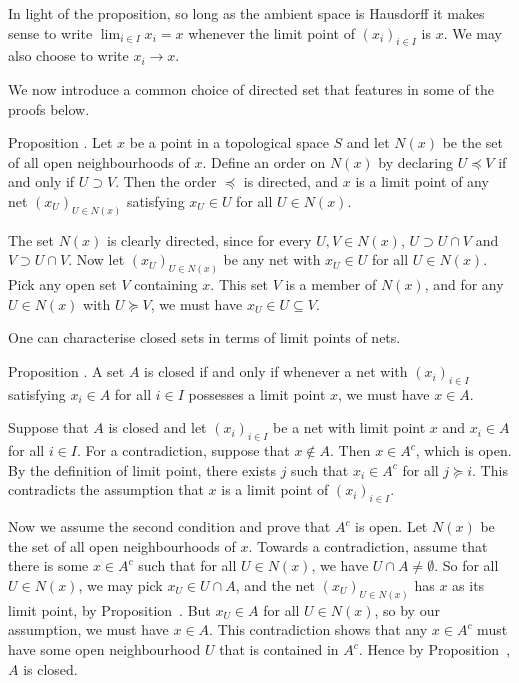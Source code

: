 In light of the proposition, so long as the ambient space is Hausdorff it makes sense to write
$\lim_{i\in I} x_i = x$ whenever the limit point of $(x_i)_{i\in I}$ is $x$. We may also choose
to write $x_i \to x$.

We now introduce a common choice of directed set that features in some of the proofs below.

\edef\propnbhdnet{\the\thmcount}
\proclaim Proposition \advthm.
Let $x$ be a point in a topological space $S$ and let $N(x)$ be the set of all open neighbourhoods
of $x$. Define an order on $N(x)$ by declaring $U\preceq V$ if and only if $U\supset V$. Then the order
$\preceq$ is directed, and $x$ is a limit point of any
net $(x_U)_{U\in N(x)}$ satisfying $x_U\in U$ for all $U\in N(x)$.

\proof The set $N(x)$ is clearly directed, since for every $U,V\in N(x)$,
$U \supset U\cap V$ and $V\supset U\cap V$. Now let $(x_U)_{U\in N(x)}$ be any net with
$x_U\in U$ for all $U\in N(x)$. Pick any open set $V$ containing $x$. This set $V$ is a member of
$N(x)$, and for any $U\in N(x)$ with $U\succeq V$, we must have $x_U\in U \subseteq V$.\slug

One can characterise closed sets in terms of limit points of nets.

\proclaim Proposition \advthm. A set $A$ is closed if and only if whenever a
net with $(x_i)_{i\in I}$ satisfying $x_i\in A$ for all $i\in I$ possesses a limit point $x$,
we must have $x\in A$.

\proof Suppose that $A$ is closed and let $(x_i)_{i\in I}$ be a net with limit point $x$
and $x_i\in A$ for all $i\in I$. For a contradiction, suppose that $x\notin A$. Then $x \in A^c$,
which is open. By the definition of limit point, there exists $j$ such that $x_i\in A^c$ for all
$j\succeq i$. This contradicts the assumption that $x$ is a limit point of $(x_i)_{i\in I}$.

Now we assume the second condition and prove that $A^c$ is open.
Let $N(x)$ be the set of all open neighbourhoods of $x$.
Towards a contradiction, assume
that there is some $x\in A^c$ such that for all $U\in N(x)$, we have $U\cap A \ne \emptyset$.
So for all $U\in N(x)$, we may pick $x_U\in U\cap A$, and the net $(x_U)_{U\in N(x)}$
has $x$ as its limit point, by Proposition~{\propnbhdnet}. But $x_U\in A$ for all $U\in N(x)$,
so by our assumption, we must have $x\in A$. This contradiction shows that
any $x\in A^c$ must have some open neighbourhood $U$ that is contained in $A^c$. Hence by
Proposition~{\propopencriterion}, $A$ is closed.\slug



